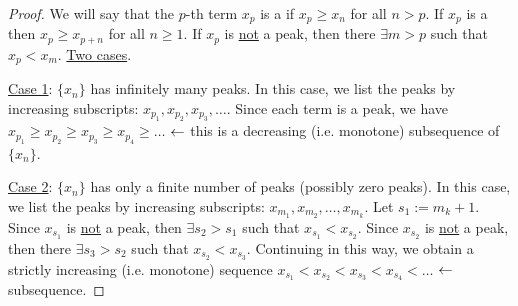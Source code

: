 \documentclass[]{article}
\begin{document}
\begin{proof}
	We will say that the $p$-th term $x_p$ is a  if $x_p \geq x_n$ for all $n>p$.
	If $x_p$ is a  then $x_p\geq x_{p+n}$ for all $n\geq 1$. 
	If $x_p$ is \ul{not} a peak, then there $\exists m>p$ such that $x_p<x_m$.
	\ul{Two cases}.
	
	\ul{Case 1}: $\{x_n\}$ has infinitely many peaks. In this case, we list the peaks by increasing subscripts: $x_{p_1},x_{p_2},x_{p_3},\dots$. Since each term is a peak, we have $x_{p_1} \geq x_{p_2} \geq x_{p_3} \geq x_{p_4} \geq \dots$ $\leftarrow $ this is a decreasing (i.e. monotone) subsequence of $\{x_n\}$.
	
	\ul{Case 2}: $\{x_n\}$ has only a finite number of peaks (possibly zero peaks).
	In this case, we list the peaks by increasing subscripts: $x_{m_1},x_{m_2},\dots,x_{m_k}$. Let $s_1 := m_k+1$. Since $x_{s_1}$ is \ul{not} a peak, then $\exists s_2 > s_1$ such that $x_{s_1} < x_{s_2}$. Since $x_{s_2}$ is \ul{not} a peak, then there $\exists s_3 > s_2$ such that $x_{s_2} < x_{s_3}$. Continuing in this way, we obtain a strictly increasing (i.e. monotone) sequence $x_{s_1} < x_{s_2} < x_{s_3} < x_{s_4} < \dots$ $\leftarrow$ subsequence.
\end{proof}
\end{document}

